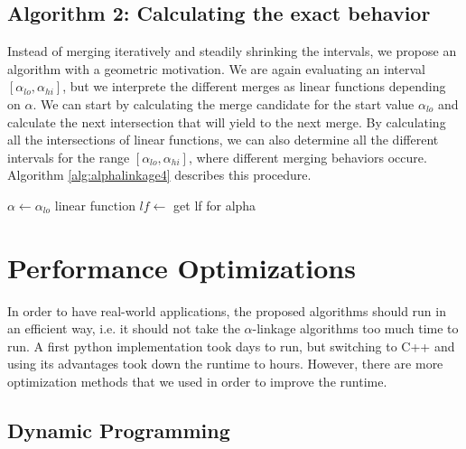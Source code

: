 \subsection{Algorithm 2: Calculating the exact behavior}

Instead of merging iteratively and steadily shrinking the intervals, we propose an algorithm with a geometric motivation. We are again evaluating an interval $[\alpha_{lo}, \alpha_{hi}]$, but we interprete the different merges as linear functions depending on $\alpha$. We can start by calculating the merge candidate for the start value $\alpha_{lo}$ and calculate the next intersection that will yield to the next merge. By calculating all the intersections of linear functions, we can also determine all the different intervals for the range $[\alpha_{lo}, \alpha_{hi}]$, where different merging behaviors occure. Algorithm \ref{alg:alphalinkage4} describes this procedure.

\begin{algorithm}[H]
    $\alpha \gets \alpha_{lo}$\;
    linear function $lf \gets$ get lf for alpha\;
    \caption{}
    \label{alg:alphalinkage4}
\end{algorithm}

\section{Performance Optimizations}

In order to have real-world applications, the proposed algorithms should run in an efficient way, i.e. it should not take the $\alpha$-linkage algorithms too much time to run. A first python implementation took days to run, but switching to C++ and using its advantages took down the runtime to hours. However, there are more optimization methods that we used in order to improve the runtime.

\subsection{Dynamic Programming}

